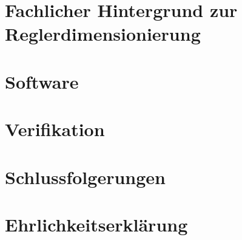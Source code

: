 \documentclass{fhnwreport/fhnwreport}
\begin{document}
\clearpage
\section{Fachlicher Hintergrund zur Reglerdimensionierung}
\label{sec:fachlicher_hintergrund}



\clearpage
\section{Software}
\label{sec:software}



\clearpage
\section{Verifikation}
\label{sec:test}



\clearpage
\section{Schlussfolgerungen}
\label{sec:schlussfolgerungen}



\clearpage
\section*{Ehrlichkeitserkl\"arung}
\label{sec:ehrlickeitserklaerung}



\clearpage
\appendix
{}





\clearpage
{}
{}
{}
\end{document}
